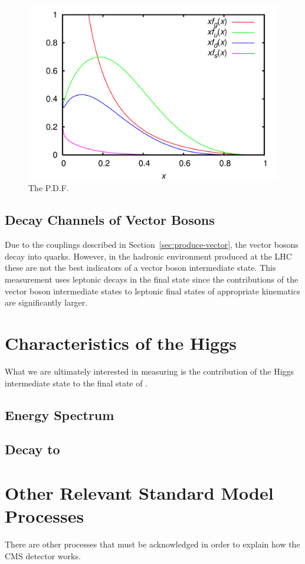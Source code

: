 \begin{figure}
  \centering
  \includegraphics[width=0.7\linewidth]{figures/CTEQ6_parton_distribution_functions.png}
  \caption{The P.D.F.}
  \label{fig:pdf}
\end{figure}



\subsection{Decay Channels of Vector Bosons}

Due to the couplings described in Section~\ref{sec:produce-vector},
the vector bosons decay into quarks.
However, in the hadronic environment produced at the LHC
these are not the best indicators of a vector boson intermediate state.
This measurement uses leptonic decays in the final state
since the contributions of the vector boson intermediate states to leptonic final states
of appropriate kinematics are significantly larger.


\section{Characteristics of the Higgs}

What we are ultimately interested in measuring is the contribution of the
Higgs intermediate state to the final state of \bb.

\subsection{Energy Spectrum}

\subsection{Decay to \bb}

\section{Other Relevant Standard Model Processes}

There are other processes that must be acknowledged in order to explain how the CMS detector works.
